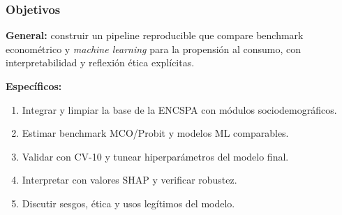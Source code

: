 \begin{frame}
\frametitle{Objetivos}
\textbf{General:} construir un pipeline reproducible que compare benchmark econométrico y \textit{machine learning} para la propensión al consumo, con interpretabilidad y reflexión ética explícitas.

\vspace{0.4cm}
\textbf{Específicos:}
\begin{enumerate}
    \item Integrar y limpiar la base de la ENCSPA con módulos sociodemográficos.
    \item Estimar benchmark MCO/Probit y modelos ML comparables.
    \item Validar con CV-10 y tunear hiperparámetros del modelo final.
    \item Interpretar con valores SHAP y verificar robustez.
    \item Discutir sesgos, ética y usos legítimos del modelo.
\end{enumerate}
\end{frame}
